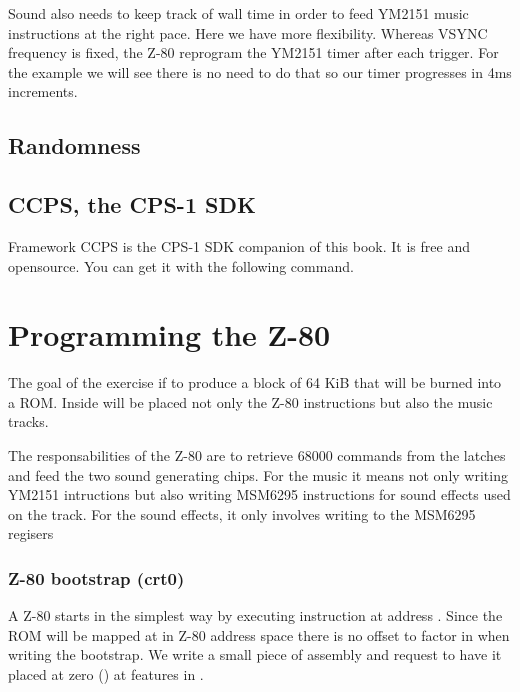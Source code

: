 Sound also needs to keep track of wall time in order to feed YM2151 music instructions at the right pace. Here we have more flexibility. Whereas VSYNC frequency is fixed,  the Z-80 reprogram the YM2151 timer after each trigger. For the example we will see there is no need to do that so our timer progresses in 4ms increments.

\section{Randomness}

\section{CCPS, the CPS-1 SDK}
Framework CCPS is the CPS-1 SDK companion of this book. It is free and opensource. You can get it with the following command.






\chapter{Programming the Z-80}

The goal of the exercise if to produce a block of 64 KiB that will be burned into a ROM. Inside will be placed not only the Z-80 instructions but also the music tracks.

The responsabilities of the Z-80 are to retrieve 68000 commands from the latches and feed the two sound generating chips. For the music it means not only writing YM2151 intructions but also writing MSM6295 instructions for sound effects used on the track. For the sound effects, it only involves writing to the MSM6295 regisers 

\subsection{Z-80 bootstrap (crt0)}

A Z-80 starts in the simplest way by executing instruction at address . Since the ROM will be mapped at  in Z-80 address space there is no offset to factor in when writing the bootstrap. We write a small piece of assembly and request to have it placed at zero () at features in .
\pagebreak




